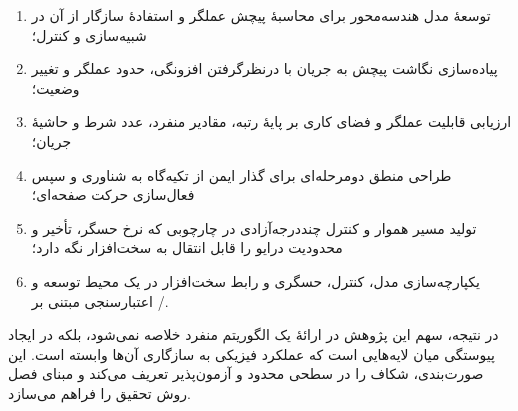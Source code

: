 \begin{enumerate}
	\item توسعهٔ مدل هندسه‌محور برای محاسبهٔ پیچش عملگر و استفادهٔ سازگار از آن در شبیه‌سازی و کنترل؛
	\item پیاده‌سازی نگاشت پیچش به جریان با درنظرگرفتن افزونگی، حدود عملگر و تغییر وضعیت؛
	\item ارزیابی قابلیت عملگر و فضای کاری بر پایهٔ رتبه، مقادیر منفرد، عدد شرط و حاشیهٔ جریان؛
	\item طراحی منطق دومرحله‌ای برای گذار ایمن از تکیه‌گاه به شناوری و سپس فعال‌سازی حرکت صفحه‌ای؛
	\item تولید مسیر هموار و کنترل چنددرجه‌آزادی در چارچوبی که نرخ حسگر، تأخیر و محدودیت درایو را قابل انتقال به سخت‌افزار نگه دارد؛
	\item یکپارچه‌سازی مدل، کنترل، حسگری و رابط سخت‌افزار در یک محیط توسعه و اعتبارسنجی مبتنی بر /.
\end{enumerate}

در نتیجه، سهم این پژوهش در ارائهٔ یک الگوریتم منفرد خلاصه نمی‌شود، بلکه در ایجاد پیوستگی میان لایه‌هایی است که عملکرد فیزیکی  به سازگاری آن‌ها وابسته است. این صورت‌بندی، شکاف را در سطحی محدود و آزمون‌پذیر تعریف می‌کند و مبنای فصل روش تحقیق را فراهم می‌سازد.

